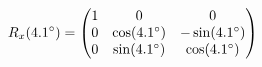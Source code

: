 \documentclass[preview]{standalone}
\begin{document}
\begin{align*}
\special{dvisvgm:raw <g id='unique000'>}R_x(4.1^\circ) = \begin{pmatrix} 1 & 0 & 0 \\ 0 & \cos(4.1^\circ) & -\sin(4.1^\circ) \\ 0 & \sin(4.1^\circ) & \cos(4.1^\circ) \end{pmatrix}\special{dvisvgm:raw </g>}
\end{align*}
\end{document}
